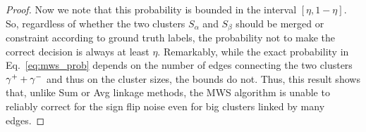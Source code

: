 \begin{proof}
Now we note that this probability is bounded in the interval $[\eta, 1-\eta]$. So, regardless of whether the two clusters $S_\alpha$ and $S_\beta$ should be merged or constraint according to ground truth labels, the probability not to make the correct decision is always at least $\eta$.
Remarkably, while the exact probability in Eq.~\ref{eq:mws_prob} depends on the number of edges connecting the two clusters $\gamma^++\gamma^-$ and thus on the cluster sizes, the bounds do not. Thus, this result shows that, unlike Sum or Avg linkage methods, the MWS algorithm is unable to reliably correct for the sign flip noise even for big clusters linked by many edges.
\end{proof}



